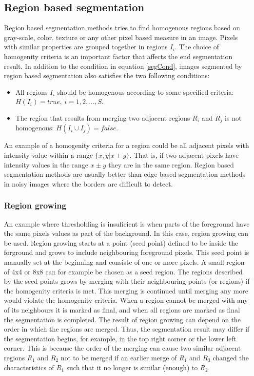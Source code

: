 \subsection{Region based segmentation}
Region based segmentation methods tries to find homogenous regions based on gray-scale, color, texture or any other pixel based measure in an image. Pixels with similar properties are grouped together in regions \(I_i\). The choice of homogenity criteria is an important factor that affects the end segmentation result. In addition to the condition in equation \ref{segCond}, images segmented by region based segmentation also satisfies the two following conditions:
\begin{itemize}
  \item All regions \(I_i\) should be homogenous according to some specified criteria: \(H(I_i) = true, \ i=1,2,...,S.\) \label{test}
  \item The region that results from merging two adjacent regions \(R_i\) and \(R_j\) is not homogenous: \(H(I_i \cup I_j) = false. \label{test2} \) 
\end{itemize}
An example of a homogenity criteria for a region could be all adjacent pixels with intensity value within a range \(\{x,y|x \pm y\}\). That is, if two adjacent pixels have intensity values in the range \(x \pm y\) they are in the same region. Region based segmentation methods are usually better than edge based segmentation methods in noisy images where the borders are difficult to detect. 

\subsubsection{Region growing}
An example where thresholding is insuficient is when parts of the foreground
have the same pixels values as part of the background. In this case, region
growing can be used. Region growing starts at a point (seed point) defined
to be inside the forground and grows to include neighbouring foreground
pixels. This seed point is manually set at the beginning and consiste of one
or more pixels. A small region of 4x4 or 8x8 can for example be chosen as a seed region. The regions described by the seed points grows by merging with their neighbouring points (or regions) if the homogenity criteria is met. This merging is continued until merging any more would violate the homogenity criteria. When a region cannot be merged with any of its neighbours it is marked as final, and when all regions are marked as final the segmentation is completed. The result of region growing can depend on the order in which the regions are merged. Thus, the segmentation result may differ if the segmentation begins, for example, in the top right corner or the lower left corner. This is because the order of the merging can cause two similar adjacent regions \(R_1\) and \(R_2\) not to be merged if an earlier merge of \(R_1\) and \(R_3\) changed the characteristics of \(R_1\) such that it no longer is similar (enough) to \(R_2\). 

